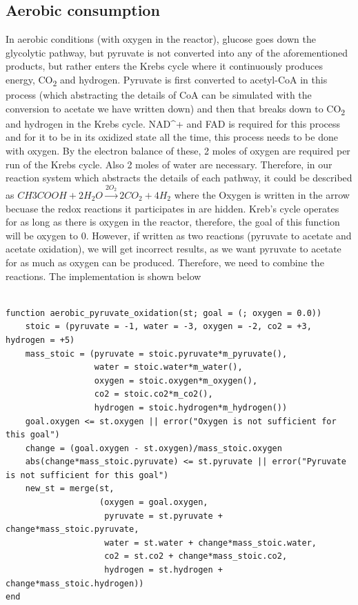 \documentclass[11pt]{article}
\begin{document}
\subsection{Aerobic consumption}
\label{sec:org048b268}
In aerobic conditions (with oxygen in the reactor), glucose goes down the glycolytic pathway, but pyruvate is not converted into any of the aforementioned products, but rather enters the Krebs cycle where it continuously produces energy, CO\textsubscript{2} and hydrogen. Pyruvate is first converted to acetyl-CoA in this process (which abstracting the details of CoA can be simulated with the conversion to acetate we have written down) and then that breaks down to CO\textsubscript{2} and hydrogen in the Krebs cycle. NAD\^{}+ and FAD is required for this process and for it to be in its oxidized state all the time, this process needs to be done with oxygen. By the electron balance of these, 2 moles of oxygen are required per run of the Krebs cycle. Also 2 moles of water are necessary. Therefore, in our reaction system which abstracts the details of each pathway, it could be described as \(CH3COOH + 2 H_2O \xrightarrow{2O_2} 2 CO_{2} + 4H_2\) where the Oxygen is written in the arrow becuase the redox reactions it participates in are hidden. Kreb's cycle operates for as long as there is oxygen in the reactor, therefore, the goal of this function will be oxygen to 0. However, if written as two reactions (pyruvate to acetate and acetate oxidation), we will get incorrect results, as we want pyruvate to acetate for as much as oxygen can be produced. Therefore, we need to combine the reactions. The implementation is shown below

\begin{verbatim}

function aerobic_pyruvate_oxidation(st; goal = (; oxygen = 0.0))
    stoic = (pyruvate = -1, water = -3, oxygen = -2, co2 = +3, hydrogen = +5)
    mass_stoic = (pyruvate = stoic.pyruvate*m_pyruvate(),
                  water = stoic.water*m_water(),
                  oxygen = stoic.oxygen*m_oxygen(),
                  co2 = stoic.co2*m_co2(),
                  hydrogen = stoic.hydrogen*m_hydrogen())
    goal.oxygen <= st.oxygen || error("Oxygen is not sufficient for this goal")
    change = (goal.oxygen - st.oxygen)/mass_stoic.oxygen
    abs(change*mass_stoic.pyruvate) <= st.pyruvate || error("Pyruvate is not sufficient for this goal")
    new_st = merge(st,
                   (oxygen = goal.oxygen,
                    pyruvate = st.pyruvate + change*mass_stoic.pyruvate,
                    water = st.water + change*mass_stoic.water,
                    co2 = st.co2 + change*mass_stoic.co2,
                    hydrogen = st.hydrogen + change*mass_stoic.hydrogen))
end

\end{verbatim}
\end{document}
